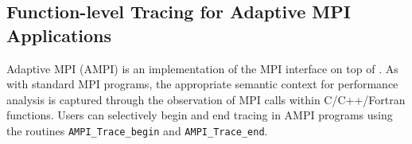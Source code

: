 \subsection{Function-level Tracing for Adaptive MPI Applications}
\label{sec::AMPI functions}

Adaptive MPI (AMPI) is an implementation of the MPI interface on top
of \charmpp{}. As with standard MPI programs, the appropriate semantic
context for performance analysis is captured through the observation
of MPI calls within C/C++/Fortran functions. Users can selectively begin
and end tracing in AMPI programs using the routines \texttt{AMPI\_Trace\_begin}
and \texttt{AMPI\_Trace\_end}. 
